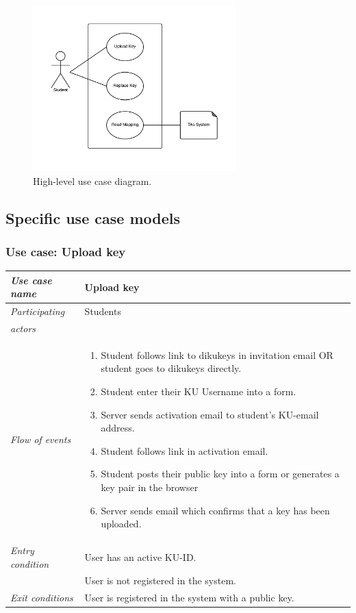 \documentclass[11pt,a4paper]{report}
\begin{document}
\begin{figure}[H]
\centering
\includegraphics[width=0.7\textwidth]{pictures/use_case_pksu_del2_b_high}
\caption{High-level use case diagram.}
\label{fig:use_case_diagram_high_level}
\end{figure}


\subsection{Specific use case models}\label{subsec:Specific_Use_case_model}

\subsubsection{Use case: Upload key}
\begin{tabular}{l p{}}
    \toprule
    \textit{Use case name} & Upload key \\
    \midrule
    \textit{Participating} & Students \\
    \textit{actors} & \\
    \midrule
    \textit{Flow of events} &
    \vspace{-6.7mm} \begin{enumerate}
        \item Student follows link to dikukeys in invitation email OR student goes to dikukeys directly.
        \item Student enter their KU Username into a form.
        \item Server sends activation email to student's KU-email address.
        \item Student follows link in activation email.
        \item Student posts their public key into a form or generates a key pair in the browser
        \item Server sends email which confirms that a key has been uploaded.
    \end{enumerate}
    \\
    \midrule
    \textit{Entry condition} & User has an active KU-ID. \\
                             & User is not registered in the system. \\
    \midrule
    \textit{Exit conditions} & User is registered in the system with a public key. \\
    \bottomrule
\end{tabular}
\end{document}
